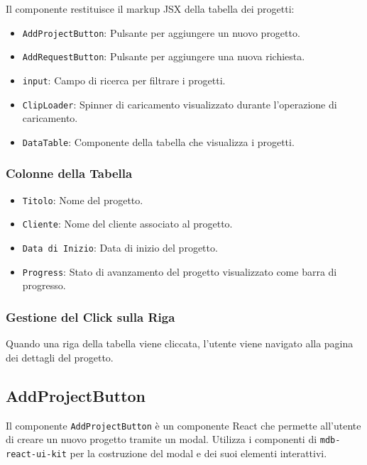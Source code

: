 \documentclass{article}
\begin{document}
Il componente restituisce il markup JSX della tabella dei progetti:

\begin{itemize}
    \item \texttt{AddProjectButton}: Pulsante per aggiungere un nuovo progetto.
    \item \texttt{AddRequestButton}: Pulsante per aggiungere una nuova richiesta.
    \item \texttt{input}: Campo di ricerca per filtrare i progetti.
    \item \texttt{ClipLoader}: Spinner di caricamento visualizzato durante l'operazione di caricamento.
    \item \texttt{DataTable}: Componente della tabella che visualizza i progetti.
\end{itemize}

\subsubsection*{Colonne della Tabella}

\begin{itemize}
    \item \texttt{Titolo}: Nome del progetto.
    \item \texttt{Cliente}: Nome del cliente associato al progetto.
    \item \texttt{Data di Inizio}: Data di inizio del progetto.
    \item \texttt{Progress}: Stato di avanzamento del progetto visualizzato come barra di progresso.
\end{itemize}

\subsubsection*{Gestione del Click sulla Riga}

Quando una riga della tabella viene cliccata, l'utente viene navigato alla pagina dei dettagli del progetto.

\subsection*{AddProjectButton}

Il componente \texttt{AddProjectButton} è un componente React che permette all'utente di creare un nuovo progetto tramite un modal. Utilizza i componenti di \texttt{mdb-react-ui-kit} per la costruzione del modal e dei suoi elementi interattivi.
\end{document}
